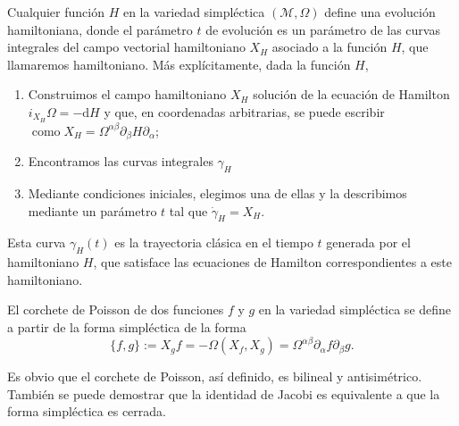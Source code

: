 Cualquier función $H$ en la variedad simpléctica $(\mathscr{M}, \Omega)$ define una evolución hamiltoniana, donde el parámetro $t$ de evolución es un parámetro de las curvas integrales del campo vectorial hamiltoniano $X_{H}$ asociado a la función $H$, que llamaremos hamiltoniano. Más explícitamente, dada la función $H$,
\begin{enumerate}
  \item Construimos el campo hamiltoniano $X_{H}$ solución de la ecuación de Hamilton $i_{X_{H}} \Omega=-\mathrm{d} H$ y que, en coordenadas arbitrarias, se puede escribir $\operatorname{como} X_{H}=\Omega^{\alpha \beta} \partial_{\beta} H \partial_{\alpha}$;
  \item Encontramos las curvas integrales $\gamma_{H}$ 
  \item Mediante condiciones iniciales, elegimos una de ellas y la describimos mediante un parámetro $t$ tal que $\dot{\gamma}_{H}=X_{H}$.
\end{enumerate}


Esta curva $\gamma_{H}(t)$ es la trayectoria clásica en el tiempo $t$ generada por el hamiltoniano $H$, que satisface las ecuaciones de Hamilton correspondientes a este hamiltoniano.

El corchete de Poisson de dos funciones $f$ y $g$ en la variedad simpléctica se define a partir de la forma simpléctica de la forma
$$
\{f, g\}:=X_{g} f=-\Omega\left(X_{f}, X_{g}\right)=\Omega^{\alpha \beta} \partial_{\alpha} f \partial_{\beta} g .
$$

Es obvio que el corchete de Poisson, así definido, es bilineal y antisimétrico. También se puede demostrar  que la identidad de Jacobi es equivalente a que la forma simpléctica es cerrada.
